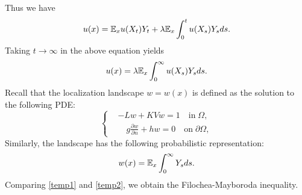 \documentclass[a4paper,11pt]{article}
\begin{document}
\begin{appendices}
Thus we have
\begin{equation*}
u(x) = \mathbb{E}_xu(X_t)Y_t+\lambda\mathbb{E}_x\int_0^t u(X_s)Y_sds.
\end{equation*}
Taking $t\rightarrow\infty$ in the above equation yields
\begin{equation}\label{temp1}
u(x) = \lambda\mathbb{E}_x\int_0^\infty u(X_s)Y_sds.
\end{equation}
Recall that the localization landscape $w = w(x)$ is defined as the solution to the following PDE:
\begin{equation*}
\left\{
\begin{split}
& - L w + K V w = 1 \quad \textrm{in} \; \Omega, \\
& \quad g \frac{\partial w}{\partial n} + h w = 0 \quad \textrm{on} \; \partial \Omega,
\end{split}\right.
\end{equation*}
Similarly, the landscape has the following probabilistic representation:
\begin{equation}\label{temp2}
w(x) = \mathbb{E}_x\int_0^\infty Y_sds.
\end{equation}
Comparing \eqref{temp1} and \eqref{temp2}, we obtain the Filochea-Mayboroda inequality.



\end{appendices}
\end{document}
